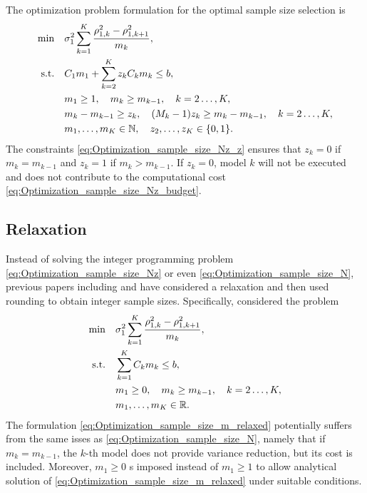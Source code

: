 The optimization problem formulation for the optimal sample size selection is
\begin{subequations}\label{eq:Optimization_sample_size_Nz}
    \begin{align}
    \min \quad &\sigma_1^2  \sum_{k=1}^K \frac{ \rho_{1,k}^2 - \rho_{1,k+1}^2}{m_k},   \\
       \text{s.t.}\quad &  C_1 m_1 + \sum_{k=2}^K z_k C_k m_k \le b,       \label{eq:Optimization_sample_size_Nz_budget}  \\
                                & m_1\ge 1,\quad  m_k \ge m_{k-1}, \quad k=2\ldots,K,\\
                                & m_k - m_{k-1} \ge z_k, \quad (M_k-1) z_k \ge m_k - m_{k-1},  \quad k=2\ldots,K,  \label{eq:Optimization_sample_size_Nz_z}  \\
                                &m_1,\ldots, m_K\in \mathbb{N}, \quad z_2 ,\ldots, z_K\in \{0,1\}.
    \end{align}
\end{subequations}
The constraints \eqref{eq:Optimization_sample_size_Nz_z} ensures that $z_k = 0$ if $m_k = m_{k-1}$ and 
$z_k = 1$ if $m_k >  m_{k-1}$. If $z_k = 0$, model $k$ will not be executed and does not contribute to the 
computational cost \eqref{eq:Optimization_sample_size_Nz_budget}.




\subsection{Relaxation}  \label{sec:MFMC_mk_optimize_relax}
Instead of solving the integer programming problem \eqref{eq:Optimization_sample_size_Nz} or
even \eqref{eq:Optimization_sample_size_N}, previous papers including
\cite{BPeherstorfer_KWillcox_MDGunzburger_2016a} and \cite{AGruber_MGunzburger_LJu_ZWang_2023a}
have considered a relaxation  and then used rounding to obtain integer sample sizes.
Specifically, \cite{BPeherstorfer_KWillcox_MDGunzburger_2016a}
considered the problem
\begin{subequations}\label{eq:Optimization_sample_size_m_relaxed}
    \begin{align}
    \label{eq:Optimization_sample_size_m_relaxed_obj}
    \min \quad &\sigma_1^2  \sum_{k=1}^K \frac{ \rho_{1,k}^2 - \rho_{1,k+1}^2}{m_k},   \\
       \text{s.t.}\quad & \sum_{k=1}^K C_km_k \le b,       \\
                                & m_1\ge 0,\quad  m_k \ge m_{k-1}, \quad k=2\ldots,K,\\
                                &m_1,\ldots, m_K\in \mathbb{R}.
    \end{align}
\end{subequations}
The formulation \eqref{eq:Optimization_sample_size_m_relaxed} potentially suffers from the same isses as 
\eqref{eq:Optimization_sample_size_N}, namely that if  $m_k = m_{k-1}$, the $k$-th model does not
provide variance reduction, but its cost is included. Moreover, $m_1\ge 0$ s imposed instead of 
$m_1\ge 1$ to allow analytical solution of \eqref{eq:Optimization_sample_size_m_relaxed}  under
suitable conditions.


